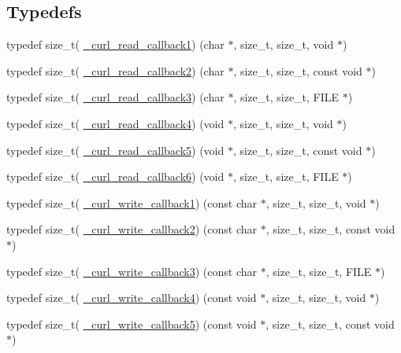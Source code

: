 \subsection*{Typedefs}
\begin{DoxyCompactItemize}
\item 
typedef size\+\_\+t( \hyperlink{typecheck-gcc_8h_aa598cc71fb379db1bc23ff76e8b875c1}{\+\_\+curl\+\_\+read\+\_\+callback1}) (char $\ast$, size\+\_\+t, size\+\_\+t, void $\ast$)
\item 
typedef size\+\_\+t( \hyperlink{typecheck-gcc_8h_abc8917aae6499414b1ed0d570d8a9b72}{\+\_\+curl\+\_\+read\+\_\+callback2}) (char $\ast$, size\+\_\+t, size\+\_\+t, const void $\ast$)
\item 
typedef size\+\_\+t( \hyperlink{typecheck-gcc_8h_a9202adcd389876f4145aec8acd84387e}{\+\_\+curl\+\_\+read\+\_\+callback3}) (char $\ast$, size\+\_\+t, size\+\_\+t, F\+I\+LE $\ast$)
\item 
typedef size\+\_\+t( \hyperlink{typecheck-gcc_8h_acb4f6e1103153bc123153dc508530645}{\+\_\+curl\+\_\+read\+\_\+callback4}) (void $\ast$, size\+\_\+t, size\+\_\+t, void $\ast$)
\item 
typedef size\+\_\+t( \hyperlink{typecheck-gcc_8h_acb2e70bfa62e3fad2801c74ad83ae43c}{\+\_\+curl\+\_\+read\+\_\+callback5}) (void $\ast$, size\+\_\+t, size\+\_\+t, const void $\ast$)
\item 
typedef size\+\_\+t( \hyperlink{typecheck-gcc_8h_a7cac2f82ccf5a3dcb04f60d865119cce}{\+\_\+curl\+\_\+read\+\_\+callback6}) (void $\ast$, size\+\_\+t, size\+\_\+t, F\+I\+LE $\ast$)
\item 
typedef size\+\_\+t( \hyperlink{typecheck-gcc_8h_a6e919be022ec3a171fe5a52105753ba3}{\+\_\+curl\+\_\+write\+\_\+callback1}) (const char $\ast$, size\+\_\+t, size\+\_\+t, void $\ast$)
\item 
typedef size\+\_\+t( \hyperlink{typecheck-gcc_8h_aad4fdd999d08cae171a468c1e97d55d4}{\+\_\+curl\+\_\+write\+\_\+callback2}) (const char $\ast$, size\+\_\+t, size\+\_\+t, const void $\ast$)
\item 
typedef size\+\_\+t( \hyperlink{typecheck-gcc_8h_a94115d6760e3f7d4815177ca51903dce}{\+\_\+curl\+\_\+write\+\_\+callback3}) (const char $\ast$, size\+\_\+t, size\+\_\+t, F\+I\+LE $\ast$)
\item 
typedef size\+\_\+t( \hyperlink{typecheck-gcc_8h_a8c3b7fedfa10f92d318198423336183d}{\+\_\+curl\+\_\+write\+\_\+callback4}) (const void $\ast$, size\+\_\+t, size\+\_\+t, void $\ast$)
\item 
typedef size\+\_\+t( \hyperlink{typecheck-gcc_8h_adbc7b265ad924bbb086fe32e0b52935f}{\+\_\+curl\+\_\+write\+\_\+callback5}) (const void $\ast$, size\+\_\+t, size\+\_\+t, const void $\ast$)

\end{DoxyCompactItemize}
